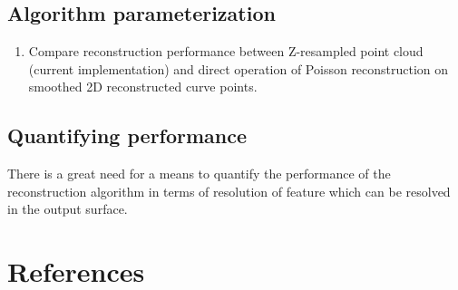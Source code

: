\documentclass[10pt,a4paper]{article}
\begin{document}
\subsection{Algorithm parameterization}
\begin{enumerate}
	\item Compare reconstruction performance between Z-resampled point cloud (current implementation) and direct operation of Poisson reconstruction on smoothed 2D reconstructed curve points.
\end{enumerate}

\subsection{Quantifying performance}
There is a great need for a means to quantify the performance of the reconstruction algorithm in terms of resolution of feature which can be resolved in the output surface. 


\section{References}

	
\end{document}
